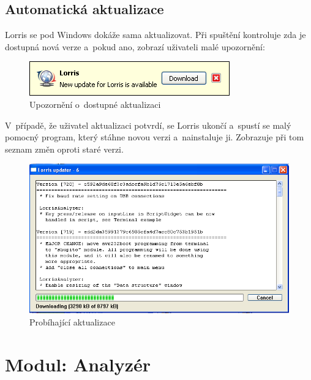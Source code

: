 \documentclass[12pt, a4paper, oneside]{article}
\begin{document}
\subsection{Automatická aktualizace}
Lorris se pod Windows dokáže sama aktualizovat. Při spuštění kontroluje zda je dostupná nová verze a~pokud ano, zobrazí uživateli malé upozornění:
\begin{figure}[H]
\begin{center}
\includegraphics[scale=1]{img/update_notify.png}
\caption{Upozornění o~dostupné aktualizaci}
\end{center}
\end{figure}
V~případě, že uživatel aktualizaci potvrdí, se Lorris ukončí a~spustí se malý pomocný program, který stáhne novou verzi a~nainstaluje ji. Zobrazuje při tom seznam změn oproti staré verzi.
\begin{figure}[H]
\begin{center}
\includegraphics[scale=0.65]{img/updater.png}
\caption{Probíhající aktualizace}
\end{center}
\end{figure}

\newpage
\section{Modul: Analyzér}
\end{document}
